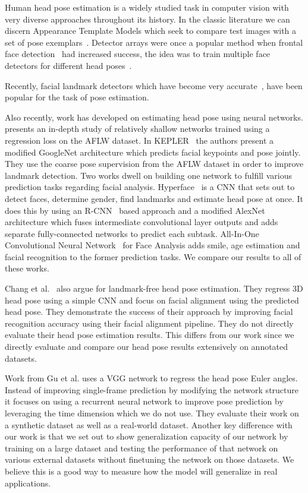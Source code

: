 \documentclass[10pt,twocolumn,letterpaper]{article}
\begin{document}
Human head pose estimation is a widely studied task in computer vision with very diverse approaches throughout its history. In the classic literature we can discern Appearance Template Models which seek to compare test images with a set of pose exemplars~\cite{s88, s110, s111}. Detector arrays were once a popular method when frontal face detection~\cite{s97,s104} had increased success, the idea was to train multiple face detectors for different head poses~\cite{s47, s146}.

Recently, facial landmark detectors which have become very accurate~\cite{bulat2017far,zhu2016face,KEPLER}, have been popular for the task of pose estimation.

Also recently, work has developed on estimating head pose using neural networks. \cite{patacchiola2017head} presents an in-depth study of relatively shallow networks trained using a regression loss on the AFLW dataset. In KEPLER~\cite{KEPLER} the authors present a modified GoogleNet architecture which predicts facial keypoints and pose jointly. They use the coarse pose supervision from the AFLW dataset in order to improve landmark detection. Two works dwell on building one network to fulfill various prediction tasks regarding facial analysis. Hyperface~\cite{ranjan2016hyperface} is a CNN that sets out to detect faces, determine gender, find landmarks and estimate head pose at once. It does this by using an R-CNN~\cite{girshick14CVPR} based approach and a modified AlexNet architecture which fuses intermediate convolutional layer outputs and adds separate fully-connected networks to predict each subtask. All-In-One Convolutional Neural Network~\cite{allinone} for Face Analysis adds smile, age estimation and facial recognition to the former prediction tasks. We compare our results to all of these works.

Chang et al.~\cite{chang2017faceposenet} also argue for landmark-free head pose estimation. They regress 3D head pose using a simple CNN and focus on facial alignment using the predicted head pose. They demonstrate the success of their approach by improving facial recognition accuracy using their facial alignment pipeline. They do not directly evaluate their head pose estimation results. This differs from our work since we directly evaluate and compare our head pose results extensively on annotated datasets.

Work from Gu et al.\cite{nvidia} uses a VGG network to regress the head pose Euler angles. Instead of improving single-frame prediction by modifying the network structure it focuses on using a recurrent neural network to improve pose prediction by leveraging the time dimension which we do not use. They evaluate their work on a synthetic dataset as well as a real-world dataset. Another key difference with our work is that we set out to show generalization capacity of our network by training on a large dataset and testing the performance of that network on various external datasets without finetuning the network on those datasets. We believe this is a good way to measure how the model will generalize in real applications.
\end{document}
